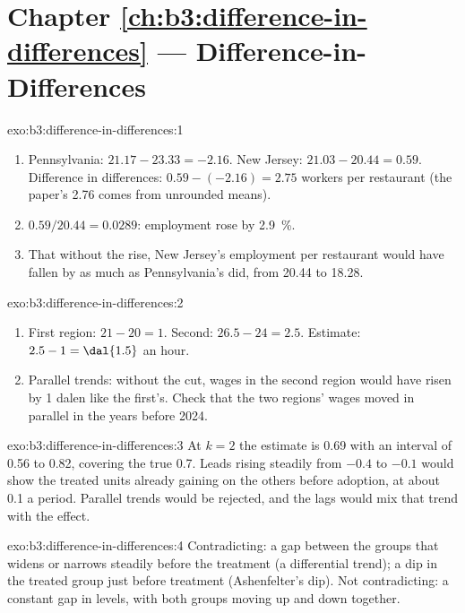 \section*{Chapter \ref{ch:b3:difference-in-differences} --- Difference-in-Differences}

\begin{solution}{exo:b3:difference-in-differences:1}
\begin{enumerate}
\item Pennsylvania: $21.17 - 23.33 = -2.16$. New Jersey: $21.03 - 20.44 = 0.59$.
Difference in differences: $0.59 - (-2.16) = 2.75$ workers per restaurant (the
paper's 2.76 comes from unrounded means). %
\item $0.59/20.44 = 0.0289$: employment rose by 2.9~\%.
\item That without the rise, New Jersey's employment per restaurant would have
fallen by as much as Pennsylvania's did, from 20.44 to 18.28.
\end{enumerate}
\end{solution}

\begin{solution}{exo:b3:difference-in-differences:2}
\begin{enumerate}
\item First region: $21 - 20 = 1$. Second: $26.5 - 24 = 2.5$. Estimate: $2.5 - 1 =
\dal{1.5}$ an hour.
\item Parallel trends: without the cut, wages in the second region would have
risen by 1 dalen like the first's. Check that the two regions' wages moved in
parallel in the years before 2024.
\end{enumerate}
\end{solution}

\begin{solution}{exo:b3:difference-in-differences:3}
At $k = 2$ the estimate is 0.69 with an interval of 0.56 to 0.82, covering the
true 0.7. %
Leads rising steadily from $-0.4$ to $-0.1$ would show the treated units
already gaining on the others before adoption, at about 0.1 a period. Parallel
trends would be rejected, and the lags would mix that trend with the effect.
\end{solution}

\begin{solution}{exo:b3:difference-in-differences:4}
Contradicting: a gap between the groups that widens or narrows steadily before
the treatment (a differential trend); a dip in the treated group just before
treatment (Ashenfelter's dip). Not contradicting: a constant gap in levels, with
both groups moving up and down together.
\end{solution}

